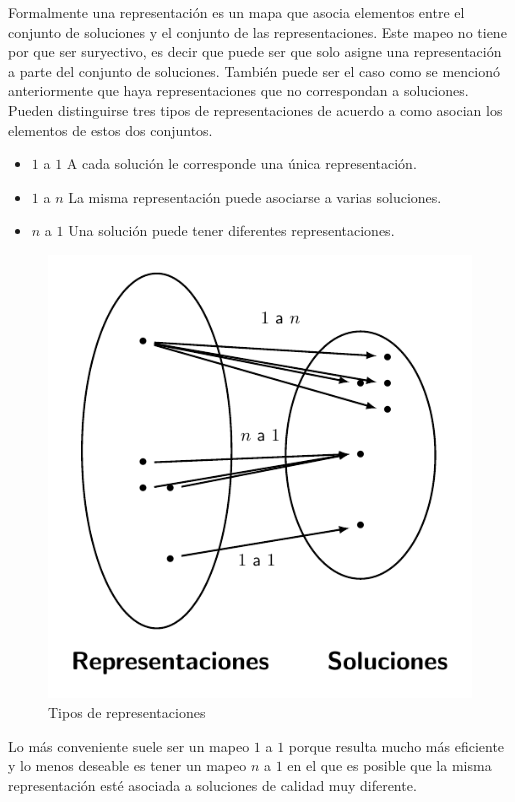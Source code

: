 Formalmente una representación es un mapa que asocia elementos entre el conjunto de soluciones y el conjunto de las representaciones. Este mapeo no tiene por que ser suryectivo, es decir que puede ser que solo asigne una representación a parte del conjunto de soluciones. También puede ser el caso como se mencionó anteriormente que haya representaciones que no correspondan a soluciones. Pueden distinguirse tres tipos de representaciones\cite{Cheng1996} de acuerdo a como asocian los elementos de estos dos conjuntos.
\begin{itemize}
    \item $1$ a $1$ A cada solución le corresponde una única representación.
    \item $1$ a $n$ La misma representación puede asociarse a varias soluciones.
    \item $n$ a $1$ Una solución puede tener diferentes representaciones.
\end{itemize}

\begin{figure}[H]
    \centering
    \includegraphics[scale=1]{Imagenes/representacion.pdf}
    \caption{Tipos de representaciones}
\end{figure}

Lo más conveniente suele ser un mapeo $1$ a $1$ porque resulta mucho más eficiente y lo menos deseable es tener un mapeo $n$ a $1$ en el que es posible que la misma representación esté asociada a soluciones de calidad muy diferente. 


